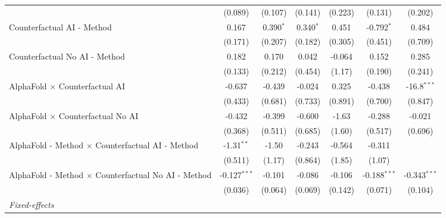 \begin{tabular}{lcccccc}
                                                              & (0.089)        & (0.107)      & (0.141)     & (0.223)      & (0.131)        & (0.202)\\   
   Counterfactual AI - Method                                 & 0.167          & 0.390$^{*}$  & 0.340$^{*}$ & 0.451        & -0.792$^{*}$   & 0.484\\   
                                                              & (0.171)        & (0.207)      & (0.182)     & (0.305)      & (0.451)        & (0.709)\\   
   Counterfactual No AI - Method                              & 0.182          & 0.170        & 0.042       & -0.064       & 0.152          & 0.285\\   
                                                              & (0.133)        & (0.212)      & (0.454)     & (1.17)       & (0.190)        & (0.241)\\   
   AlphaFold $\times$ Counterfactual AI                       & -0.637         & -0.439       & -0.024      & 0.325        & -0.438         & -16.8$^{***}$\\   
                                                              & (0.433)        & (0.681)      & (0.733)     & (0.891)      & (0.700)        & (0.847)\\   
   AlphaFold $\times$ Counterfactual No AI                    & -0.432         & -0.399       & -0.600      & -1.63        & -0.288         & -0.021\\   
                                                              & (0.368)        & (0.511)      & (0.685)     & (1.60)       & (0.517)        & (0.696)\\   
   AlphaFold - Method $\times$ Counterfactual AI - Method     & -1.31$^{**}$   & -1.50        & -0.243      & -0.564       & -0.311         &   \\   
                                                              & (0.511)        & (1.17)       & (0.864)     & (1.85)       & (1.07)         &   \\   
   AlphaFold - Method $\times$ Counterfactual No AI - Method  & -0.127$^{***}$ & -0.101       & -0.086      & -0.106       & -0.188$^{***}$ & -0.343$^{***}$\\   
                                                              & (0.036)        & (0.064)      & (0.069)     & (0.142)      & (0.071)        & (0.104)\\   
   \midrule
   \emph{Fixed-effects}\\

\end{tabular}
